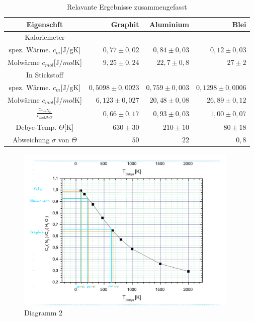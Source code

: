 \begin{table}[h!]
    \centering
    \begin{tabular}{c|r r r}
        \toprule
        Eigenschft & Graphit & Aluminium & Blei \\
        \midrule
        Kaloriemeter \\
        spez. Wärme. $c_m$[J/gK] & $ 0,77 \pm 0,02$ & $0,84 \pm 0,03$ & $0,12 \pm 0,03$ \\
        Molwärme    $c_{mol}$[J/$mol$K] &$ 9,25\pm 0,24$ & $22,7 \pm 0,8$ & $27 \pm2 $\\
        \midrule
        In Stickstoff \\
        spez. Wärme. $c_m$[J/gK] &$ 0,5098 \pm 0,0023 $& $0,759 \pm 0,003 $& $0,1298 \pm 0,0006 $\\
        Molwärme   $c_{mol}$[J/$mol$K]& $6,123 \pm 0,027$& $20,48 \pm 0,08$&$ 26,89 \pm 0,12$\\
        \midrule
        $\frac{c_{molN_2}}{c_{molH_2O}}$ &$0,66 \pm 0,17 $& $0,93 \pm 0,03$ &$ 1,00 \pm 0,07$\\
        Debye-Temp. $\Theta$[K] & $630 \pm 30$ & $210 \pm 10$ &  $80 \pm 18$\\
        Abweichung $\sigma$ von $\Theta$  & $50$ & $22$ &  $0,8$\\
        \bottomrule
        
    \end{tabular}
    \caption{Relavante Ergebnisse zusammengefasst}
\end{table}
\begin{figure}[h!]
    \centering
    \includegraphics[width=0.95\textwidth,]{Versuch42Dia2.jpeg}
    \caption{Diagramm 2}
\end{figure}
\newpage